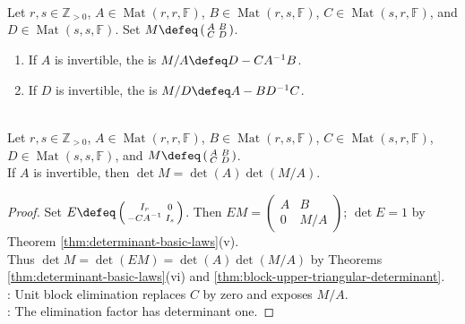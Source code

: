 \begin{illustrationfigure}[H]
  \centering
  
  \caption{A real linear map scales oriented volume by its determinant; singular maps collapse volume to zero.}
  \label{fig:matrix-determinant-volume-scaling}
\end{illustrationfigure}

\begin{definition} \label{def:schur-complements} \\
Let $r,s\in\mathbb{Z}_{>0}$, $A\in\operatorname{Mat}(r,r,\mathbb{F})$, $B\in\operatorname{Mat}(r,s,\mathbb{F})$, $C\in\operatorname{Mat}(s,r,\mathbb{F})$, and $D\in\operatorname{Mat}(s,s,\mathbb{F})$. Set $M\defeq\left(\begin{smallmatrix}A&B\\C&D\end{smallmatrix}\right)$.
\begin{enumerate}[label=(\roman*)]
\setlength{\itemsep}{0pt}
\item If $A$ is invertible, the  is $M/A\defeq D-CA^{-1}B$.
\item If $D$ is invertible, the  is $M/D\defeq A-BD^{-1}C$.
\end{enumerate}
\end{definition}

\begin{proposition} \label{prop:schur-complement-determinant-formula} \\
Let $r,s\in\mathbb{Z}_{>0}$, $A\in\operatorname{Mat}(r,r,\mathbb{F})$, $B\in\operatorname{Mat}(r,s,\mathbb{F})$, $C\in\operatorname{Mat}(s,r,\mathbb{F})$, $D\in\operatorname{Mat}(s,s,\mathbb{F})$, and $M\defeq\left(\begin{smallmatrix}A&B\\C&D\end{smallmatrix}\right)$.\\
If $A$ is invertible, then $\det M=\det(A)\det(M/A)$.
\begin{proof}
Set $E\defeq\left(\begin{smallmatrix}I_r&0\\-CA^{-1}&I_s\end{smallmatrix}\right)$. Then $EM=\left(\begin{smallmatrix}A&B\\0&M/A\end{smallmatrix}\right)$; $\det E=1$ by Theorem \ref{thm:determinant-basic-laws}(v).\\
Thus $\det M=\det(EM)=\det(A)\det(M/A)$ by Theorems \ref{thm:determinant-basic-laws}(vi) and \ref{thm:block-upper-triangular-determinant}.\\
: Unit block elimination replaces $C$ by zero and exposes $M/A$.\\
: The elimination factor has determinant one.
\end{proof}
\end{proposition}

